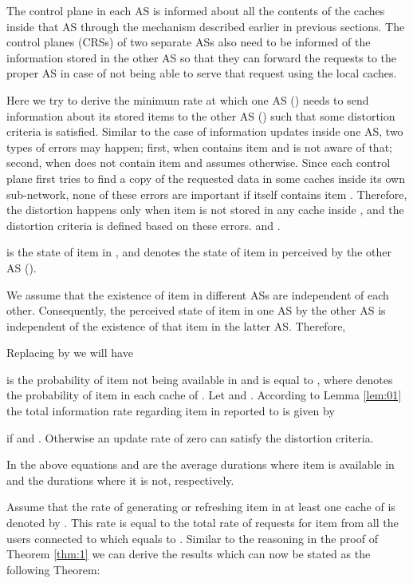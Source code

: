\documentclass[conference]{IEEEtran}
\theoremstyle{plain}
\theoremstyle{remark}
\begin{document}
The control plane in each AS is informed about all the contents of the caches inside that AS through the mechanism described earlier in previous sections. The control planes (CRSs) of two separate ASs also need to be informed of the information stored in the other AS so that they can forward the requests to the proper AS in case of not being able to serve that request using the local caches.

Here we try to derive the minimum rate at which one AS () needs to send information about its stored items to the other AS () such that some distortion criteria is satisfied. Similar to the case of information updates inside one AS, two types of errors may happen; first, when  contains item  and  is not aware of that; second, when  does not contain item  and  assumes otherwise. Since each control plane first tries to find a copy of the requested data in some caches inside its own sub-network, none of these errors are  important if  itself contains item . Therefore, the distortion happens only when item  is not stored in any cache inside , and the distortion criteria is defined based on these errors.
 and .

 is the state of item  in  , and  denotes the state of item  in  perceived by the other AS ().

We assume that the existence of item  in different ASs are independent of each other. Consequently, the perceived state of item  in one AS by the other AS is independent of the existence of that item in the latter AS. Therefore,




Replacing  by  we will have


 is the probability of item  not being available in  and is equal to , where  denotes the probability of item  in each cache of . Let  and .
According to Lemma \ref{lem:01} the total information rate regarding item  in  reported to  is given by


if  and . Otherwise an update rate of zero can satisfy the distortion criteria.
	
In the above equations  and  are the average durations where item  is available in  and the durations where it is not, respectively.

Assume that the rate of generating or refreshing item  in at least one cache of  is denoted by . This rate is equal to the total rate of requests for item  from all the users connected to  which equals to . Similar to the reasoning in the proof of Theorem \ref{thm:1} we can derive the results which can now be stated as the following Theorem:
\end{document}
